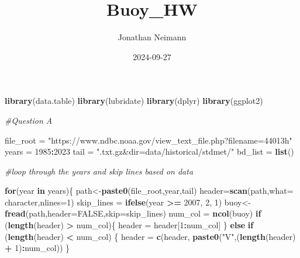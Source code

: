 \documentclass[
]{article}
\title{Buoy\_HW}
\author{Jonathan Neimann}
\date{2024-09-27}
\newenvironment{Shaded}{\begin{snugshade}}{\end{snugshade}}
\newcommand{\AttributeTok}[1]{\textcolor[rgb]{0.13,0.29,0.53}{#1}}
\newcommand{\CommentTok}[1]{\textcolor[rgb]{0.56,0.35,0.01}{\textit{#1}}}
\newcommand{\ConstantTok}[1]{\textcolor[rgb]{0.56,0.35,0.01}{#1}}
\newcommand{\ControlFlowTok}[1]{\textcolor[rgb]{0.13,0.29,0.53}{\textbf{#1}}}
\newcommand{\DecValTok}[1]{\textcolor[rgb]{0.00,0.00,0.81}{#1}}
\newcommand{\FunctionTok}[1]{\textcolor[rgb]{0.13,0.29,0.53}{\textbf{#1}}}
\newcommand{\NormalTok}[1]{#1}
\newcommand{\OtherTok}[1]{\textcolor[rgb]{0.56,0.35,0.01}{#1}}
\newcommand{\SpecialCharTok}[1]{\textcolor[rgb]{0.81,0.36,0.00}{\textbf{#1}}}
\newcommand{\StringTok}[1]{\textcolor[rgb]{0.31,0.60,0.02}{#1}}
\begin{document}
\maketitle

\begin{Shaded}
\begin{Highlighting}[]
\FunctionTok{library}\NormalTok{(data.table)}
\FunctionTok{library}\NormalTok{(lubridate)}
\FunctionTok{library}\NormalTok{(dplyr)}
\FunctionTok{library}\NormalTok{(ggplot2)}

\CommentTok{\#Question A}

\NormalTok{file\_root }\OtherTok{=} \StringTok{"https://www.ndbc.noaa.gov/view\_text\_file.php?filename=44013h"}
\NormalTok{years }\OtherTok{=} \DecValTok{1985}\SpecialCharTok{:}\DecValTok{2023}
\NormalTok{tail }\OtherTok{=} \StringTok{".txt.gz\&dir=data/historical/stdmet/"}
\NormalTok{bd\_list }\OtherTok{=} \FunctionTok{list}\NormalTok{()}

\CommentTok{\#loop through the years and skip lines based on data}

\ControlFlowTok{for}\NormalTok{(year }\ControlFlowTok{in}\NormalTok{ years)\{}
\NormalTok{  path}\OtherTok{\textless{}{-}}\FunctionTok{paste0}\NormalTok{(file\_root,year,tail)}
\NormalTok{  header}\OtherTok{=}\FunctionTok{scan}\NormalTok{(path,}\AttributeTok{what=} \StringTok{\textquotesingle{}character\textquotesingle{}}\NormalTok{,}\AttributeTok{nlines=}\DecValTok{1}\NormalTok{)}
\NormalTok{  skip\_lines }\OtherTok{=} \FunctionTok{ifelse}\NormalTok{(year }\SpecialCharTok{\textgreater{}=} \DecValTok{2007}\NormalTok{, }\DecValTok{2}\NormalTok{, }\DecValTok{1}\NormalTok{)}
\NormalTok{  buoy}\OtherTok{\textless{}{-}}\FunctionTok{fread}\NormalTok{(path,}\AttributeTok{header=}\ConstantTok{FALSE}\NormalTok{,}\AttributeTok{skip=}\NormalTok{skip\_lines)}
\NormalTok{  num\_col }\OtherTok{=} \FunctionTok{ncol}\NormalTok{(buoy)}
  \ControlFlowTok{if}\NormalTok{ (}\FunctionTok{length}\NormalTok{(header) }\SpecialCharTok{\textgreater{}}\NormalTok{ num\_col)\{}
\NormalTok{    header }\OtherTok{=}\NormalTok{ header[}\DecValTok{1}\SpecialCharTok{:}\NormalTok{num\_col]}
\NormalTok{  \} }\ControlFlowTok{else} \ControlFlowTok{if}\NormalTok{ (}\FunctionTok{length}\NormalTok{(header) }\SpecialCharTok{\textless{}}\NormalTok{ num\_col) \{}
\NormalTok{    header }\OtherTok{=} \FunctionTok{c}\NormalTok{(header, }\FunctionTok{paste0}\NormalTok{(}\StringTok{"V"}\NormalTok{,(}\FunctionTok{length}\NormalTok{(header) }\SpecialCharTok{+} \DecValTok{1}\NormalTok{)}\SpecialCharTok{:}\NormalTok{num\_col))}
\NormalTok{  \}}
  

\end{Highlighting}
\end{Shaded}
\end{document}
